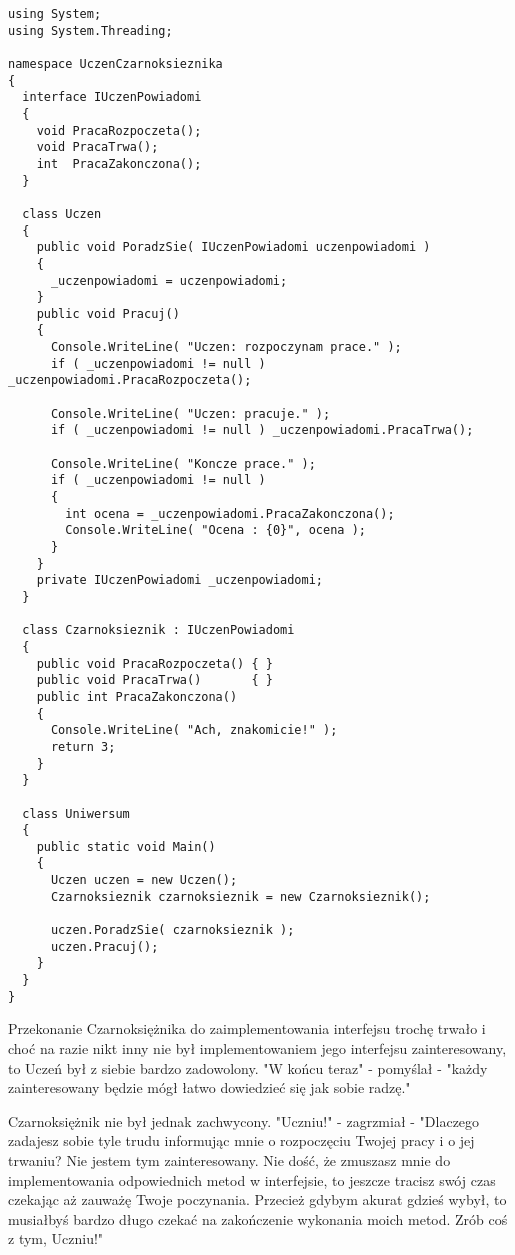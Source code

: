{\begin{scriptsize}
\begin{verbatim}
using System;
using System.Threading;

namespace UczenCzarnoksieznika
{	
  interface IUczenPowiadomi
  {
    void PracaRozpoczeta();
    void PracaTrwa();
    int  PracaZakonczona();
  }
  
  class Uczen
  {
    public void PoradzSie( IUczenPowiadomi uczenpowiadomi )
    {
      _uczenpowiadomi = uczenpowiadomi;  	
    }
    public void Pracuj()
    {
      Console.WriteLine( "Uczen: rozpoczynam prace." );
      if ( _uczenpowiadomi != null ) _uczenpowiadomi.PracaRozpoczeta();
  		
      Console.WriteLine( "Uczen: pracuje." );
      if ( _uczenpowiadomi != null ) _uczenpowiadomi.PracaTrwa();
  	  
      Console.WriteLine( "Koncze prace." );
      if ( _uczenpowiadomi != null ) 
      {
        int ocena = _uczenpowiadomi.PracaZakonczona();
        Console.WriteLine( "Ocena : {0}", ocena );
      }
    }
    private IUczenPowiadomi _uczenpowiadomi;
  }
  
  class Czarnoksieznik : IUczenPowiadomi
  {
    public void PracaRozpoczeta() { }
    public void PracaTrwa()       { }
    public int PracaZakonczona() 
    {
      Console.WriteLine( "Ach, znakomicie!" );
      return 3;
    }
  }
  
  class Uniwersum
  {
    public static void Main()
    {
      Uczen uczen = new Uczen();
      Czarnoksieznik czarnoksieznik = new Czarnoksieznik();
  		
      uczen.PoradzSie( czarnoksieznik );  		
      uczen.Pracuj();
    }
  }
}
\end{verbatim}
\end{scriptsize}

Przekonanie Czarnoksiężnika do zaimplementowania interfejsu trochę trwało i choć na razie nikt 
inny nie był implementowaniem jego interfejsu zainteresowany, to Uczeń był z siebie bardzo zadowolony.
"W końcu teraz" - pomyślał - "każdy zainteresowany będzie mógł łatwo dowiedzieć się jak sobie radzę."

Czarnoksiężnik nie był jednak zachwycony. "Uczniu!" - zagrzmiał - "Dlaczego zadajesz sobie
tyle trudu informując mnie o rozpoczęciu Twojej pracy i o jej trwaniu? Nie jestem tym zainteresowany.
Nie dość, że zmuszasz mnie do implementowania odpowiednich metod w interfejsie, 
to jeszcze tracisz swój czas czekając
aż zauważę Twoje poczynania. Przecież gdybym akurat gdzieś wybył, to musiałbyś bardzo długo czekać
na zakończenie wykonania moich metod. Zrób coś z tym, Uczniu!"

}
